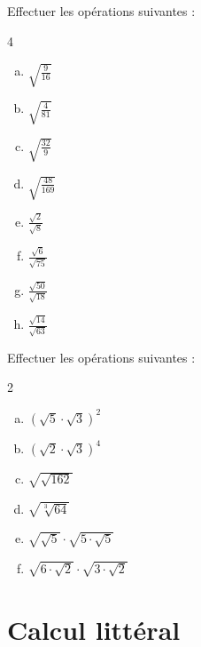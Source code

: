 \documentclass[twoside, a4paper, 12pt, openright, fullpage]{book}
\begin{document}
\begin{exercice}\label{racines2}
Effectuer les opérations suivantes :
\begin{multicols}{4}
\begin{enumerate}[a)]
    \item $\sqrt{\frac{9}{16}}$
    \item $\sqrt{\frac{4}{81}}$
    \item $\sqrt{\frac{32}{9}}$
    \item $\sqrt{\frac{48}{169}}$
    \item $\frac{\sqrt{2}}{\sqrt{8}}$
    \item $\frac{\sqrt{6}}{\sqrt{75}}$
    \item $\frac{\sqrt{50}}{\sqrt{18}}$
    \item $\frac{\sqrt{14}}{\sqrt{63}}$
    \end{enumerate}
\end{multicols}
\end{exercice}

\begin{exercice}\label{racines3}
Effectuer les opérations suivantes :
\begin{multicols}{2}
\begin{enumerate}[a)]
    \item $\left( \sqrt{5} \cdot \sqrt{3}\right)^2$
    \item $\left(  \sqrt{2} \cdot \sqrt{3}\right)^4$
    \item $\sqrt{\sqrt{162}}$
    \item $\sqrt{\sqrt[3]{64}}$
    \item $\sqrt{\sqrt{5}}\cdot \sqrt{5\cdot \sqrt{5}}$
    \item $\sqrt{6\cdot \sqrt{2}}\cdot \sqrt{3\cdot \sqrt{2}}$
    \end{enumerate}
\end{multicols}
\end{exercice}

\section{Calcul littéral}
\end{document}
